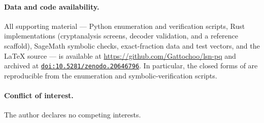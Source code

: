 \documentclass[11pt,a4paper]{article}
\theoremstyle{plain}
\theoremstyle{definition}
\begin{document}
\paragraph{\textbf{Data and code availability.}} All supporting material --- Python enumeration and verification scripts, Rust implementations (cryptanalysis screens, decoder validation, and a reference scaffold), SageMath symbolic checks, exact-fraction data and test vectors, and the \LaTeX{} source --- is available at \url{https://github.com/Gattochoo/lsn-pq} and archived at \href{https://doi.org/10.5281/zenodo.20646796}{\texttt{doi:10.5281/zenodo.20646796}}. In particular, the closed forms of  are reproducible from the enumeration and symbolic-verification scripts.

\paragraph{\textbf{Conflict of interest.}} The author declares no competing interests.
\end{document}
